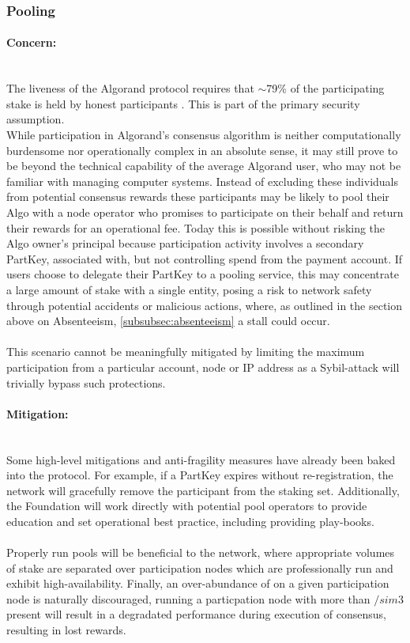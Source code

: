 \documentclass[11pt,a4paper]{article}
\begin{document}
\pagebreak

\subsubsection{Pooling}

\paragraph{Concern:} \mbox{}\\
The liveness of the Algorand protocol requires that $\sim$79\% of the participating stake is held by honest participants
. This is part of the primary security assumption. \\
While participation in Algorand's consensus algorithm is neither computationally burdensome nor operationally complex in 
an absolute sense, it may still prove to be beyond the technical capability of the average Algorand user, who may not
be familiar with managing computer systems. Instead of excluding these individuals from potential consensus rewards 
these participants may be likely to pool their Algo with a node operator who promises to participate on their behalf and 
return their rewards for an operational fee. Today this is possible without risking the Algo owner’s principal because 
participation activity involves a secondary \gls{PartKey}, associated with, but not controlling spend from the 
payment account. If users choose to delegate their \gls{PartKey} to a pooling service, this may concentrate a large 
amount of stake with a single entity, posing a risk to network safety through potential accidents or malicious actions, 
where, as outlined in the section above on Absenteeism, \ref{subsubsec:absenteeism} a stall could occur. \\ \\
This scenario cannot be meaningfully mitigated by limiting the maximum participation from a particular account, 
node or IP address as a Sybil-attack will trivially bypass such protections.

\paragraph{Mitigation:} \mbox{}\\
Some high-level mitigations and anti-fragility measures have already been baked into the protocol. For example, if a
\gls{PartKey} expires without re-registration, the network will gracefully remove the participant from the staking set.
Additionally, the Foundation will work directly with potential pool operators to provide education and set operational
best practice, including providing play-books. \\ \\
Properly run pools will be beneficial to the network, where appropriate volumes of stake are separated over
participation nodes which are professionally run and exhibit high-availability. Finally, an over-abundance of 
 on a given participation node is naturally discouraged, running a particpation node with more than 
$/sim$3  present will result in a degradated performance during execution of consensus, resulting in 
lost rewards.
\end{document}
